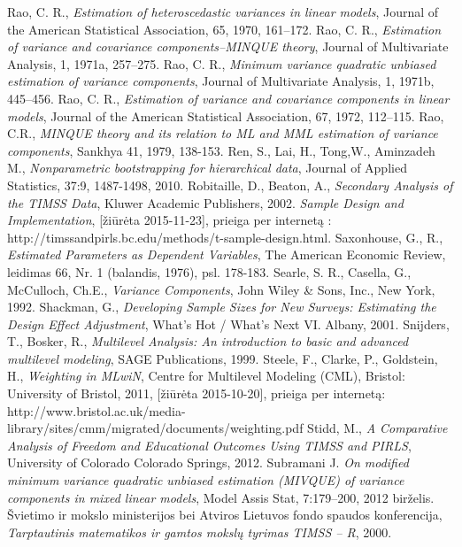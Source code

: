 \documentclass[12pt,a4paper]{article}
\begin{document}
\begin{thebibliography}{1}
Rao, C. R., \textit{Estimation of heteroscedastic variances in linear models}, Journal of the American Statistical Association, 65, 1970, 161–172.
 Rao, C. R., \textit{Estimation of variance and covariance components–MINQUE theory}, Journal of Multivariate Analysis, 1, 1971a, 257–275.
 Rao, C. R., \textit{Minimum variance quadratic unbiased estimation of variance components}, Journal of Multivariate Analysis, 1, 1971b, 445–456.
 Rao, C. R., \textit{Estimation of variance and covariance components in linear models}, Journal of the American Statistical Association, 67, 1972, 112–115.
 Rao, C.R., \textit{MINQUE theory and its relation to ML and MML estimation of variance components}, Sankhya 41, 1979, 138-153.
 Ren, S., Lai, H., Tong,W., Aminzadeh M., \textit{Nonparametric bootstrapping for hierarchical data}, Journal of Applied Statistics, 37:9, 1487-1498, 2010.
 Robitaille, D., Beaton, A., \textit{Secondary Analysis of the TIMSS Data}, Kluwer Academic Publishers, 2002.
 \textit{Sample Design and Implementation}, [žiūrėta 2015-11-23], prieiga per internetą : http://timssandpirls.bc.edu/methods/t-sample-design.html.
 Saxonhouse, G., R., \textit{Estimated Parameters as Dependent Variables}, The American Economic Review,
leidimas 66, Nr. 1 (balandis, 1976), psl. 178-183.
 Searle, S. R., Casella, G., McCulloch, Ch.E., \textit{Variance Components}, John Wiley \& Sons, Inc., New York, 1992.
 Shackman, G., \textit{Developing Sample Sizes for New Surveys: Estimating the Design Effect Adjustment}, What’s Hot / What’s Next VI. Albany, 2001.
 Snijders, T., Bosker, R., \textit{Multilevel Analysis: An introduction to basic and advanced multilevel modeling}, SAGE Publications, 1999.
 Steele, F., Clarke, P., Goldstein, H., \textit{Weighting in MLwiN}, Centre for Multilevel Modeling (CML), Bristol: University of Bristol, 2011, [žiūrėta 2015-10-20], prieiga per internetą: http://www.bristol.ac.uk/media-library/sites/cmm/migrated/documents/weighting.pdf
 Stidd, M., \textit{A Comparative Analysis of Freedom and Educational Outcomes Using TIMSS and PIRLS}, University of Colorado Colorado Springs, 2012.
Subramani J. \textit{On modified minimum variance quadratic unbiased estimation (MIVQUE) of variance components in mixed linear models}, Model Assis Stat, 7:179–200, 2012 birželis.
 Švietimo ir mokslo ministerijos bei Atviros Lietuvos fondo spaudos konferencija, \textit{Tarptautinis matematikos ir gamtos mokslų tyrimas TIMSS – R}, 2000.

\end{thebibliography}
\end{document}
